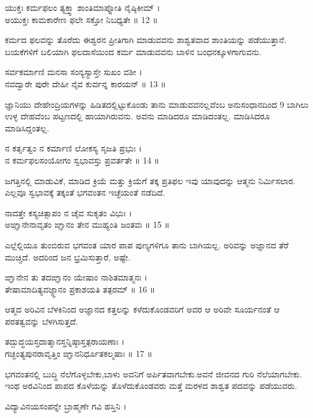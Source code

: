 ಯುಕ್ತಃ ಕರ್ಮಫಲಂ ತ್ಯಕ್ತ್ವಾ ಶಾಂತಿಮಾಪ್ನೋತಿ ನೈಷ್ಠಿಕೀಮ್ ।\\
ಅಯುಕ್ತಃ ಕಾಮಕಾರೇಣ ಫಲೇ ಸಕ್ತೋ ನಿಬಧ್ಯತೇ ॥ 12 ॥
\begin{quoting}
ಕರ್ಮದ ಫಲವನ್ನು ತೊರೆದು ಈಶ್ವರನ ಪ್ರೀತಿಗಾಗಿ ಮಾಡುವವನು ಶಾಶ್ವತವಾದ ಶಾಂತಿಯನ್ನು ಪಡೆಯುತ್ತಾನೆ. ಬಯಕೆಗಳಿಗೆ ಬಲಿಯಾಗಿ ಫಲದಾಸೆಯಿಂದ ಕರ್ಮ ಮಾಡುವವನು ಬಾಳಿನ ಬಂಧನಕ್ಕೂಳಗಾಗುವನು.\\
\end{quoting}
ಸರ್ವಕರ್ಮಾಣಿ ಮನಸಾ ಸಂನ್ಯಸ್ಯಾಸ್ತೇ ಸುಖಂ ವಶೀ ।\\
ನವದ್ವಾರೇ ಪುರೇ ದೇಹೀ ನೈವ ಕುರ್ವನ್ನ ಕಾರಯನ್ ॥ 13 ॥
\begin{quoting}
ಜ್ಞಾನಿಯು ದೇಹೇಂದ್ರಿಯಗಳನ್ನು ಹಿಡಿತದಲ್ಲಿಟ್ಟುಕೊಂಡು ತಾನು ಮಾಡುವವನಲ್ಲವೆಂಬ ಅನುಸಂಧಾನದಿಂದ 9 ಬಾಗಿಲು ಉಳ್ಳ ದೇಹವೆಂಬ ಪಟ್ಟಣದಲ್ಲಿ ಹಾಯಾಗಿರುವನು. ಅವನು ಮಾಡಿದರೂ ಮಾಡಿದಂತಲ್ಲ. ಮಾಡಿಸಿದರೂ ಮಾಡಿಸಿದ್ದಂತಲ್ಲ.\\
\end{quoting}
ನ ಕರ್ತೃತ್ವಂ ನ ಕರ್ಮಾಣಿ ಲೋಕಸ್ಯ ಸೃಜತಿ ಪ್ರಭುಃ ।\\
ನ ಕರ್ಮಫಲಸಂಯೋಗಂ ಸ್ವಭಾವಸ್ತು ಪ್ರವರ್ತತೇ ॥ 14 ॥
\begin{quoting}
ಜಗತ್ತಿನಲ್ಲಿ ಮಾಡುವಿಕೆ, ಮಾಡಿದ ಕ್ರಿಯೆ ಮತ್ತು ಕ್ರಿಯೆಗೆ ತಕ್ಕ ಪ್ರತಿಫಲ ಇವು ಯಾವುದನ್ನು ಆತ್ಮನು ನಿರ್ಮಿಸಲಾರ. ಎಲ್ಲವೂ ಸ್ವಭಾವಕ್ಕೆ ತಕ್ಕಂತೆ ಭಗವಂತನ ಇಚ್ಛೆಯಂತೆ ನಡೆದಿದೆ.\\
\end{quoting}
ನಾದತ್ತೇ ಕಸ್ಯಚಿತ್ಪಾಪಂ ನ ಚೈವ ಸುಕೃತಂ ವಿಭುಃ ।\\
ಅಙ್ಞಾನೇನಾವೃತಂ ಙ್ಞಾನಂ ತೇನ ಮುಹ್ಯಂತಿ ಜಂತವಃ ॥ 15 ॥
\begin{quoting}
ಎಲ್ಲೆಲ್ಲಿಯೂ ತುಂಬಿರುವ ಭಗವಂತ ಯಾರ ಪಾಪ ಪುಣ್ಯಗಳಿಗೂ ತಾನು ಬಾಗಿಯಲ್ಲ. ಅರಿವನ್ನು ಅಜ್ಞಾನದ ತೆರೆ ಮುಚ್ಚಿದೆ. ಅದರಿಂದ ಜನ ಭ್ರಮಿಸುತ್ತಾರೆ, ಅಷ್ಟೇ.\\
\end{quoting}
ಙ್ಞಾನೇನ ತು ತದಙ್ಞಾನಂ ಯೇಷಾಂ ನಾಶಿತಮಾತ್ಮನಃ ।\\
ತೇಷಾಮಾದಿತ್ಯವಜ್ಙ್ಞಾನಂ ಪ್ರಕಾಶಯತಿ ತತ್ಪರಮ್ ॥ 16 ॥
\begin{quoting}
ಆತ್ಮದ ಅರಿವಿನ ಬೆಳಕಿನಿಂದ ಅಜ್ಞಾನದ ಕತ್ತಲನ್ನು ಕಳೆದುಕೊಂಡವರಿಗೆ ಅವರ ಆ ಅರಿವೇ ಸೂರ್ಯನಂತೆ ಆ ಪರತತ್ವವನ್ನು ಬೆಳಗಿಸುತ್ತದೆ.\\
\end{quoting}
ತದ್ಬುದ್ಧಯಸ್ತದಾತ್ಮಾನಸ್ತನ್ನಿಷ್ಠಾಸ್ತತ್ಪರಾಯಣಾಃ ।\\
ಗಚ್ಛಂತ್ಯಪುನರಾವೃತ್ತಿಂ ಙ್ಞಾನನಿರ್ಧೂತಕಲ್ಮಷಾಃ ॥ 17 ॥
\begin{quoting}
ಭಗವಂತನಲ್ಲಿ ಬುದ್ಧಿ ನೆಲೆಗೊಳ್ಳಬೇಕು,ಬಾಳು ಅವನಿಗೆ ಅರ್ಪಿತವಾಗಬೇಕು.ಅವನೆ ಜೀವನದ ಗುರಿ ನೆಲೆಯಾಗಬೇಕು. ಇಂಥ ಅರವಿನಿಂದ ಪಾಪದ ಕೊಳೆಯನ್ನು ತೊಳೆದುಕೊಂಡವರು ಮತ್ತೆ ಮರಳದ ಶಾಶ್ವತ ಪದವನ್ನು ಪಡೆಯುವರು.\\
\end{quoting}
ವಿದ್ಯಾವಿನಯಸಂಪನ್ನೇ ಬ್ರಾಹ್ಮಣೇ ಗವಿ ಹಸ್ತಿನಿ ।\\
